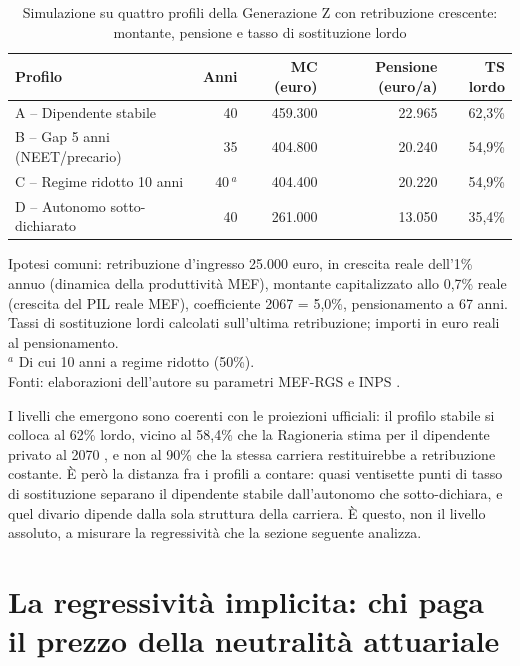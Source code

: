 \begin{table}[h!]
\centering
\small
\caption{Simulazione su quattro profili della Generazione Z con retribuzione crescente:
         montante, pensione e tasso di sostituzione lordo}
\label{tab:profili}
\begin{tabularx}{\textwidth}{X r r r r}
\toprule
\textbf{Profilo} & \textbf{Anni} & \textbf{MC (euro)}
                 & \textbf{Pensione (euro/a)}
                 & \textbf{TS lordo} \\
\midrule
A -- Dipendente stabile       & 40 & 459.300 & 22.965 & 62,3\% \\
B -- Gap 5 anni (NEET/precario)& 35 & 404.800 & 20.240 & 54,9\% \\
C -- Regime ridotto 10 anni   & 40\,$^{a}$ & 404.400 & 20.220 & 54,9\% \\
D -- Autonomo sotto-dichiarato & 40 & 261.000 & 13.050 & 35,4\% \\
\bottomrule
\end{tabularx}
\par\smallskip
\footnotesize
Ipotesi comuni: retribuzione d'ingresso 25.000 euro, in crescita reale dell'1\%
annuo (dinamica della produttività MEF), montante capitalizzato allo 0,7\% reale
(crescita del PIL reale MEF), coefficiente 2067 = 5,0\%, pensionamento a 67 anni.
Tassi di sostituzione lordi calcolati sull'ultima retribuzione; importi in euro
reali al pensionamento.\\
$^{a}$ Di cui 10 anni a regime ridotto (50\%).\\
Fonti: elaborazioni dell'autore su parametri MEF-RGS \cite{MEF_RGS2025, MEF_RGS2025_NdA}
e INPS \cite{INPS2025}.
\end{table}

\medskip
\noindent
I livelli che emergono sono coerenti con le proiezioni ufficiali: il profilo
stabile si colloca al 62\% lordo, vicino al 58,4\% che la Ragioneria stima per il
dipendente privato al 2070 \cite{MEF_RGS2025}, e non al 90\% che la stessa carriera
restituirebbe a retribuzione costante. È però la distanza fra i profili a contare:
quasi ventisette punti di tasso di sostituzione separano il dipendente stabile
dall'autonomo che sotto-dichiara, e quel divario dipende dalla sola struttura
della carriera. È questo, non il livello assoluto, a misurare la regressività che
la sezione seguente analizza.

\section{La regressività implicita: chi paga il prezzo della neutralità attuariale}
\label{sec:regressivita}


